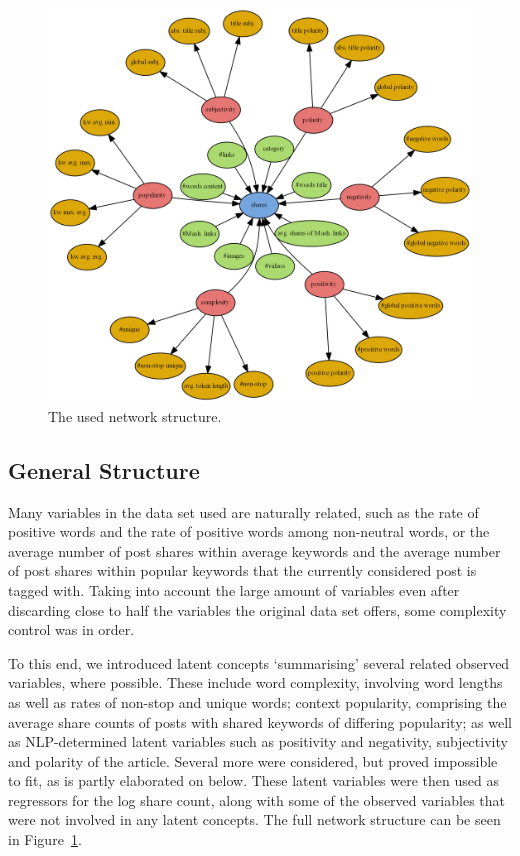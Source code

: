 \documentclass{article}
\begin{document}
\begin{figure}
    \center
    \includegraphics[width=\textwidth]{figs/network}
    \caption{The used network structure.}
    \label{fig:network}
\end{figure}

\subsection{General Structure}
Many variables in the data set used are naturally related, such as the rate of positive words and the rate of positive words among non-neutral words, or the average number of post shares within average keywords and the average number of post shares within popular keywords that the currently considered post is tagged with. Taking into account the large amount of variables even after discarding close to half the variables the original data set offers, some complexity control was in order.

To this end, we introduced latent concepts `summarising' several related observed variables, where possible. These include word complexity, involving word lengths as well as rates of non-stop and unique words; context popularity, comprising the average share counts of posts with shared keywords of differing popularity; as well as NLP-determined latent variables such as positivity and negativity, subjectivity and polarity of the article. Several more were considered, but proved impossible to fit, as is partly elaborated on below. These latent variables were then used as regressors for the log share count, along with some of the observed variables that were not involved in any latent concepts. The full network structure can be seen in Figure~\ref{fig:network}.
\end{document}
